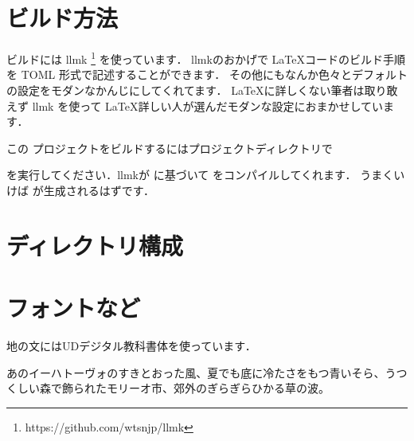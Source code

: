 \documentclass[lualatex,a4paper,ja=standard]{bxjsarticle}
\begin{document}


\section{ビルド方法}

\par ビルドには llmk \footnote{https://github.com/wtsnjp/llmk} を使っています．
llmkのおかげで \LaTeX コードのビルド手順を TOML 形式で記述することができます．
その他にもなんか色々とデフォルトの設定をモダンなかんじにしてくれてます．
\LaTeX に詳しくない筆者は取り敢えず llmk を使って \LaTeX 詳しい人が選んだモダンな設定におまかせしています．

\par この プロジェクトをビルドするにはプロジェクトディレクトリで

を実行してください．llmkが  に基づいて  をコンパイルしてくれます．
うまくいけば  が生成されるはずです．

\section{ディレクトリ構成}


\section{フォントなど}

\par 地の文にはUDデジタル教科書体を使っています．
\par あのイーハトーヴォのすきとおった風、夏でも底に冷たさをもつ青いそら、うつくしい森で飾られたモリーオ市、郊外のぎらぎらひかる草の波。
\end{document}
